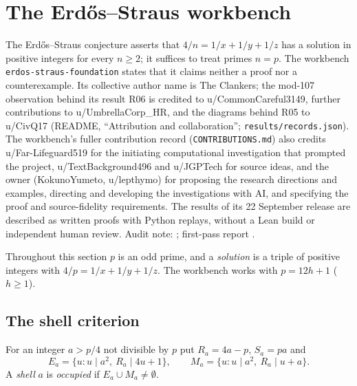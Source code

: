\section{The Erdős--Straus workbench}\label{sec:es}

The Erdős--Straus conjecture asserts that $4/n=1/x+1/y+1/z$ has a solution in positive integers for every $n\ge2$; it suffices to treat primes $n=p$.
The workbench \texttt{erdos-straus-foundation} states that it claims neither a proof nor a counterexample.
Its collective author name is The Clankers; the mod-107 observation behind its result R06 is credited to u/CommonCareful3149, further contributions to u/UmbrellaCorp\_HR, and the diagrams behind R05 to u/CivQ17 (README, ``Attribution and collaboration''; \texttt{results/records.json}). The workbench's fuller contribution record (\texttt{CONTRIBUTIONS.md}) also credits u/Far-Lifeguard519 for the initiating computational investigation that prompted the project, u/TextBackground496 and u/JGPTech for source ideas, and the owner (KokunoYumeto, u/lepthymo) for proposing the research directions and examples, directing and developing the investigations with AI, and specifying the proof and source-fidelity requirements.
The results of its 22 September release are described as written proofs with Python replays, without a Lean build or independent human review.
Audit note: ; first-pass report .

Throughout this section $p$ is an odd prime, and a \emph{solution} is a triple of positive integers with $4/p=1/x+1/y+1/z$. The workbench works with $p=12h+1$ ($h\ge1$).

\subsection{The shell criterion}

For an integer $a>p/4$ not divisible by $p$ put $R_a=4a-p$, $S_a=pa$ and
\[
E_a=\{u: u\mid a^2,\ R_a\mid 4u+1\},\qquad M_a=\{u: u\mid a^2,\ R_a\mid u+a\}.
\]
A \emph{shell} $a$ is \emph{occupied} if $E_a\cup M_a\neq\emptyset$.

